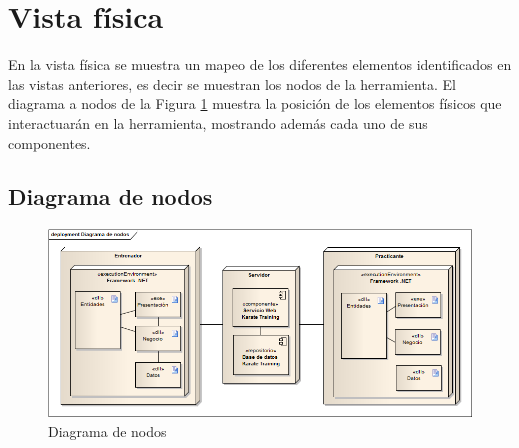 \section{Vista física}
En la vista física se muestra un mapeo de los diferentes elementos identificados en las vistas anteriores, es decir se muestran los nodos de la herramienta.
El diagrama a nodos de la Figura \ref{fig:Nodos} muestra la posición de los elementos físicos que interactuarán en la herramienta, mostrando además cada uno de sus componentes.

\subsection{Diagrama de nodos}

\begin{figure}[H]
	\begin{center}
		\includegraphics[scale=0.6]{./Figuras/Arquitectura/Diagrama_de_nodos}
	\end{center}
	\caption{Diagrama de nodos}
	\label{fig:Nodos}
\end{figure}

\clearpage